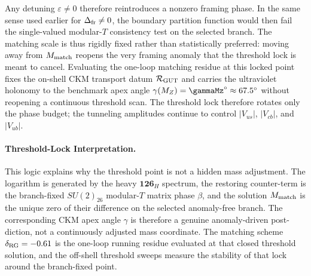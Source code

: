 \documentclass[11pt]{article}
\begin{document}
Any detuning $\varepsilon\neq0$ therefore reintroduces a nonzero framing phase.
In the same sense used earlier for $\Delta_{\rm fr}\neq0$, the boundary
partition function would then fail the single-valued modular-$T$ consistency
test on the selected branch. The matching scale is thus rigidly fixed rather
than statistically preferred: moving away from $M_{\rm match}$ reopens the very
framing anomaly that the threshold lock is meant to cancel.
Evaluating the one-loop matching residue at this locked point fixes the on-shell CKM transport datum $\mathcal R_{\rm GUT}$ and carries the ultraviolet holonomy to the benchmark apex angle $\gamma(M_Z)=\gammaMz^\circ\approx67.5^\circ$ without reopening a continuous threshold scan. The threshold lock therefore rotates only the phase budget; the tunneling amplitudes continue to control $|V_{us}|$, $|V_{cb}|$, and $|V_{ub}|$.

\paragraph{Threshold-Lock Interpretation.}
This logic explains why the threshold point is not a hidden mass adjustment. The logarithm is generated by the heavy $\mathbf{126}_H$ spectrum, the restoring counter-term is the branch-fixed $SU(2)_{26}$ modular-$T$ matrix phase $\beta$, and the solution $M_{\rm match}$ is the unique zero of their difference on the selected anomaly-free branch. The corresponding CKM apex angle $\gamma$ is therefore a genuine anomaly-driven post-diction, not a continuously adjusted mass coordinate. The matching scheme $\delta_{\rm RG}=-0.61$ is the one-loop running residue evaluated at that closed threshold solution, and the off-shell threshold sweeps measure the stability of that lock around the branch-fixed point.
\end{document}
